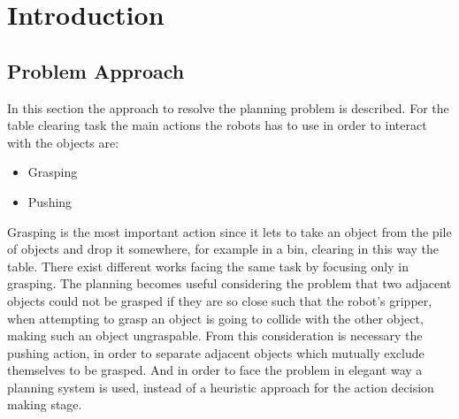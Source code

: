 \chapter{Introduction}
\label{ch:introduction}

\section{Problem Approach}
In this section the approach to resolve the planning problem is described. For the table clearing task the main actions the robots has to use in order to interact with the objects are:
\begin{itemize}
\item Grasping
\item Pushing
\end{itemize}
Grasping is the most important action since it lets to take an object from the pile of objects and drop it somewhere, for example in a bin, clearing in this way the table. There exist different works facing the same task by focusing only in grasping. The planning becomes useful considering the problem that two adjacent objects could not be grasped if they are so close such that the robot's gripper, when attempting to grasp an object is going to collide with the other object, making such an object ungraspable. From this consideration is necessary the pushing action, in order to separate adjacent objects which mutually exclude themselves to be grasped.  And in order to face the problem in elegant way a planning system is used, instead of a heuristic approach for the action decision making stage.